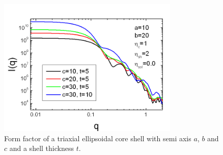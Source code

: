 \begin{figure}[htb]
\begin{center}
\includegraphics[width=0.768\textwidth,height=0.588\textwidth]{../images/form_factor/Ellipsoid/triax_ellipsoidal_core_shell.png}
\end{center}
\caption{Form factor of a triaxial ellipsoidal core shell with semi
axis $a$, $b$ and $c$ and a shell thickness $t$.}
\label{fig:I_triax_ellipsoidal_core_shell}
\end{figure}
